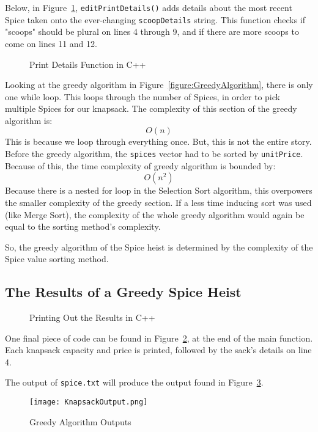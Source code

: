 \documentclass[letterpaper, 10pt,DIV=13]{scrartcl}
\numberwithin{equation}{section} %
\numberwithin{figure}{section} %
\numberwithin{table}{section} %
\begin{document}
Below, in Figure~\ref{figure:PrintDetails}, \texttt{editPrintDetails()} adds details about the most recent Spice taken onto the ever-changing \texttt{scoopDetails} string. This function checks if "scoops" should be plural on lines 4 through 9, and if there are more scoops to come on lines 11 and 12.

\begin{figure}[ht] 
    \centering 
    
    \caption{Print Details Function in C++}
    \label{figure:PrintDetails}
\end{figure}

\pagebreak

Looking at the greedy algorithm in Figure~\ref{figure:GreedyAlgorithm}, there is only one while loop. This loops through the number of Spices, in order to pick multiple Spices for our knapsack. The complexity of this section of the greedy algorithm is:
\[O(n)\]
This is because we loop through everything once. But, this is not the entire story. Before the greedy algorithm, the \texttt{spices} vector had to be sorted by \texttt{unitPrice}. Because of this, the time complexity of greedy algorithm is bounded by:
\[O(n^2)\]
Because there is a nested for loop in the Selection Sort algorithm, this overpowers the smaller complexity of the greedy section. If a less time inducing sort was used (like Merge Sort), the complexity of the whole greedy algorithm would again be equal to the sorting method's complexity.

So, the greedy algorithm of the Spice heist is determined by the complexity of the Spice value sorting method.

\subsection{The Results of a Greedy Spice Heist}


\begin{figure}[ht] 
    \centering 
    
    \caption{Printing Out the Results in C++}
    \label{figure:GreedyFinalPrint}
\end{figure}



One final piece of code can be found in Figure~\ref{figure:GreedyFinalPrint}, at the end of the main function. Each knapsack capacity and price is printed, followed by the sack's details on line 4.

The output of \texttt{spice.txt} will produce the output found in Figure~\ref{figure:KnapsackOutput}.

\begin{figure}[h] 
    \centering 
    \texttt{[image: KnapsackOutput.png]}
    \caption{Greedy Algorithm Outputs\footnotemark}
    \label{figure:KnapsackOutput}
    
\end{figure}
\end{document}
